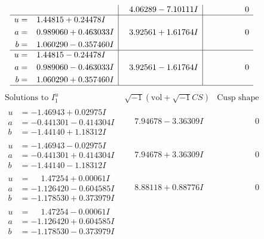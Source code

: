 \documentclass[1p]{elsarticle_modified}
\theoremstyle{definition}
\newcommand{\I}{\sqrt{-1}}
\begin{document}
$$\begin{array}{c|c|c}
 & \phantom{-}4.06289 - 7.10111 I & \phantom{-0.000000 } 0 \\ \hline\begin{aligned}
u &= \phantom{-}1.44815 + 0.24478 I \\
a &= \phantom{-}0.989060 + 0.463033 I \\
b &= \phantom{-}1.060290 - 0.357460 I\end{aligned}
 & \phantom{-}3.92561 + 1.61764 I & \phantom{-0.000000 } 0 \\ \hline\begin{aligned}
u &= \phantom{-}1.44815 - 0.24478 I \\
a &= \phantom{-}0.989060 - 0.463033 I \\
b &= \phantom{-}1.060290 + 0.357460 I\end{aligned}
 & \phantom{-}3.92561 - 1.61764 I & \phantom{-0.000000 } 0\\
 \hline 
 \end{array}$$\newpage$$\begin{array}{c|c|c}  
\text{Solutions to }I^u_{1}& \I (\text{vol} + \sqrt{-1}CS) & \text{Cusp shape}\\
 \hline 
\begin{aligned}
u &= -1.46943 + 0.02975 I \\
a &= -0.441301 - 0.414304 I \\
b &= -1.44140 + 1.18312 I\end{aligned}
 & \phantom{-}7.94678 - 3.36309 I & \phantom{-0.000000 } 0 \\ \hline\begin{aligned}
u &= -1.46943 - 0.02975 I \\
a &= -0.441301 + 0.414304 I \\
b &= -1.44140 - 1.18312 I\end{aligned}
 & \phantom{-}7.94678 + 3.36309 I & \phantom{-0.000000 } 0 \\ \hline\begin{aligned}
u &= \phantom{-}1.47254 + 0.00061 I \\
a &= -1.126420 - 0.604585 I \\
b &= -1.178530 + 0.373979 I\end{aligned}
 & \phantom{-}8.88118 + 0.88776 I & \phantom{-0.000000 } 0 \\ \hline\begin{aligned}
u &= \phantom{-}1.47254 - 0.00061 I \\
a &= -1.126420 + 0.604585 I \\
b &= -1.178530 - 0.373979 I\end{aligned}

\end{array}$$
\end{document}
